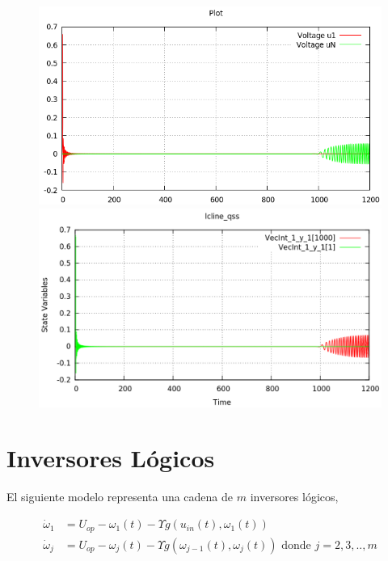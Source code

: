 \begin{figure}[H]
\centering
\begin{minipage}{0.5\textwidth}
\centering
 \includegraphics[width=\linewidth]{lcline-pd}
\end{minipage}\hfill
\begin{minipage}{0.5\textwidth}
\centering
 \includegraphics[width=\linewidth]{lcline-qss}
\end{minipage}
\end{figure}

\section{Inversores Lógicos}
	El siguiente modelo representa una cadena de $m$ inversores lógicos, 

\begin{align*}
\dot{\omega}_1 & = U_{op} - \omega_1(t) - \Upsilon g (u_{in}(t), \omega_{1} (t))    \\
\dot{\omega}_j & = U_{op} - \omega_j(t) - \Upsilon g (\omega_{j-1}(t), \omega_{j} (t)) \textrm{ donde $j = 2, 3, .., m$}
\end{align*}


